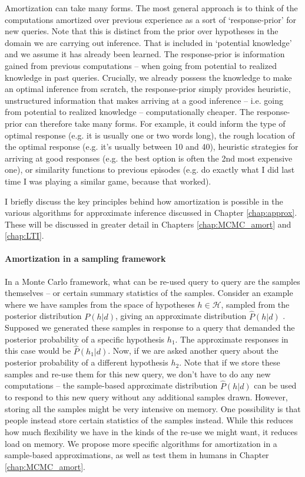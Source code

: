 Amortization can take many forms. The most general approach is to think of the computations amortized over previous experience as a sort of `response-prior' for new queries. Note that this is distinct from the prior over hypotheses in the domain we are carrying out inference. That is included in `potential knowledge' and we assume it has already been learned. The response-prior is information gained from previous computations -- when going from potential to realized knowledge in past queries. Crucially, we already possess the knowledge to make an optimal inference from scratch, the response-prior simply provides heuristic, unstructured information that makes arriving at a good inference -- i.e. going from potential to realized knowledge -- computationally cheaper. The response-prior can therefore take many forms. For example, it could inform the type of optimal response (e.g. it is usually one or two words long), the rough location of the optimal response (e.g. it's usually between 10 and 40), heuristic strategies for arriving at good responses (e.g. the best option is often the 2nd most expensive one), or similarity functions to previous episodes (e.g. do exactly what I did last time I was playing a similar game, because that worked). 

I briefly discuss the key principles behind how amortization is possible in the various algorithms for approximate inference discussed in Chapter \ref{chap:approx}. These will be discussed in greater detail in Chapters \ref{chap:MCMC_amort} and \ref{chap:LTI}.

\paragraph{Amortization in a sampling framework} 

In a Monte Carlo framework, what can be re-used query to query are the samples themselves -- or certain summary statistics of the samples. Consider an example where we have samples from the space of hypotheses $h \in \mathcal{H}$, sampled from the posterior distribution $P(h | d)$, giving an approximate distribution $\hat{P}(h | d)$ . Supposed we generated these samples in response to a query that demanded the posterior probability of a specific hypothesis $h_1$. The approximate responses in this case would be $\hat{P}(h_1 |d)$. Now, if we are asked another query about the posterior probability of a different hypothesis $h_2$. Note that if we store these samples and re-use them for this new query, we don't have to do any new computations -- the sample-based approximate distribution $\hat{P}(h | d)$ can be used to respond to this new query without any additional samples drawn. However, storing all the samples might be very intensive on memory. One possibility is that people instead store certain statistics of the samples instead. While this reduces how much flexibility we have in the kinds of the re-use we might want, it reduces load on memory. We propose more specific algorithms for amortization in a sample-based approximations, as well as test them in humans in Chapter \ref{chap:MCMC_amort}.

